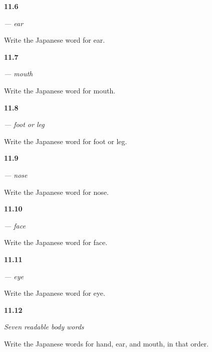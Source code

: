 \noindent\begin{minipage}[t]{\linewidth}
\raggedright
\hypertarget{review-JA-C11-mimi-meaning}{\textbf{11.6}} \emph{ — ear}\par
\small Write the Japanese word for ear.
\end{minipage}\par\medskip

\noindent\begin{minipage}[t]{\linewidth}
\raggedright
\hypertarget{review-JA-C11-kuchi-meaning}{\textbf{11.7}} \emph{ — mouth}\par
\small Write the Japanese word for mouth.
\end{minipage}\par\medskip

\noindent\begin{minipage}[t]{\linewidth}
\raggedright
\hypertarget{review-JA-C11-ashi-meaning}{\textbf{11.8}} \emph{ — foot or leg}\par
\small Write the Japanese word for foot or leg.
\end{minipage}\par\medskip

\noindent\begin{minipage}[t]{\linewidth}
\raggedright
\hypertarget{review-JA-C11-hana-meaning}{\textbf{11.9}} \emph{ — nose}\par
\small Write the Japanese word for nose.
\end{minipage}\par\medskip

\noindent\begin{minipage}[t]{\linewidth}
\raggedright
\hypertarget{review-JA-C11-kao-meaning}{\textbf{11.10}} \emph{ — face}\par
\small Write the Japanese word for face.
\end{minipage}\par\medskip

\noindent\begin{minipage}[t]{\linewidth}
\raggedright
\hypertarget{review-JA-C11-me-eye-meaning}{\textbf{11.11}} \emph{ — eye}\par
\small Write the Japanese word for eye.
\end{minipage}\par\medskip

\noindent\begin{minipage}[t]{\linewidth}
\raggedright
\hypertarget{review-JA-C11-body-map-recall}{\textbf{11.12}} \emph{Seven readable body words}\par
\small Write the Japanese words for hand, ear, and mouth, in that order.
\end{minipage}\par\medskip


